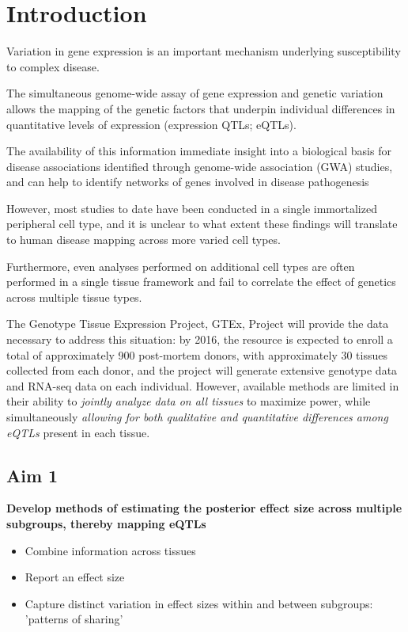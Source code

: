 \documentclass[10pt,letterpaper]{article}
\begin{document}
\linenumbers

\section*{Introduction}
Variation in gene expression is an important mechanism underlying susceptibility to complex disease. 

The simultaneous genome-wide assay of gene expression and genetic variation allows the mapping of the genetic factors that underpin individual differences in quantitative levels of expression (expression QTLs; eQTLs). 

The availability of this information immediate insight into a biological basis for disease associations identified through genome-wide association (GWA) studies, and can help to identify networks of genes 
involved in disease pathogenesis 

 However, most studies to date have been conducted in a single immortalized peripheral cell type, and it is unclear to what extent these findings will translate to human disease mapping across more varied cell types. 

Furthermore, even analyses performed on additional cell types are often performed in a single tissue framework and fail to correlate the effect of genetics across multiple tissue types.  

The Genotype Tissue Expression Project, GTEx, Project will provide the data necessary to address this situation: 
by 2016, the resource is expected to enroll a total of approximately 900 post-mortem donors, with approximately 30 tissues collected from each donor, and the project
will generate extensive genotype data and RNA-seq data on each individual. 
However,  available methods are limited in their ability to {\it jointly analyze data on all tissues} to maximize power, while
simultaneously {\it allowing for both qualitative and quantitative differences among eQTLs} present in each tissue.

\subsection{Aim 1}
{\textbf {Develop methods of estimating the posterior effect size across multiple subgroups, thereby mapping eQTLs }}
\begin{itemize}
\item Combine information across tissues%
\item Report an effect size %
\item Capture distinct variation in effect sizes within and between subgroups: 'patterns of sharing' %
%
\end{itemize}
\end{document}

